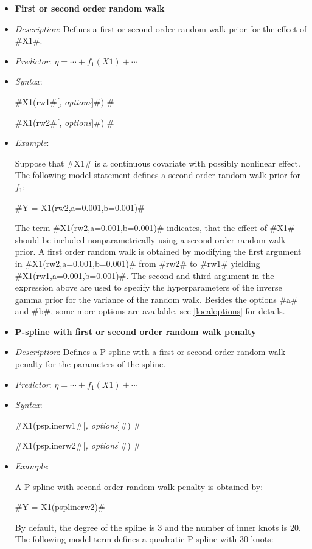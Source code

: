 \begin{itemize}
 \item[]{\bf\sffamily First or second order random walk}
 \item[]{\em Description}: Defines a first or second order random walk
 prior for the effect of #X1#.
 \item[]{\em Predictor}: $\eta = \cdots + f_1(X1) + \cdots $
 \item[] {\em Syntax}:

#X1(rw1#[, {\em options}]#) #

#X1(rw2#[, {\em options}]#) #
\item[] {\em Example}:

Suppose that #X1# is a continuous covariate with possibly
nonlinear effect. The following model statement defines a second
order random walk prior for $f_1$:

#Y = X1(rw2,a=0.001,b=0.001)#

The term #X1(rw2,a=0.001,b=0.001)# indicates, that the effect of
#X1# should be included nonparametrically using a second order
random walk prior. A first order random walk is obtained by
modifying the first argument in #X1(rw2,a=0.001,b=0.001)# from
#rw2# to #rw1# yielding #X1(rw1,a=0.001,b=0.001)#. The second and
third argument in the expression above are used to specify the
hyperparameters of the inverse gamma prior for the variance of the
random walk. Besides the options #a# and #b#, some more options
are available, see \autoref{localoptions} for details.

\item[] {\bf\sffamily P-spline with first or second order random
walk penalty}

\item[] {\em Description}: Defines a P-spline with a first or
second order random walk penalty for the parameters of the spline.
\item[] {\em Predictor}: $\eta =  \cdots + f_1(X1) + \cdots$
\item[] {\em Syntax}:

#X1(psplinerw1#[{\em , options}]#) #

#X1(psplinerw2#[{\em , options}]#) #
\item[] {\em Example}:

A P-spline with second order random walk penalty is obtained by:

#Y = X1(psplinerw2)#

By default, the degree of the spline is 3 and the number of inner
knots is 20. The following model term defines a quadratic P-spline
with 30 knots:


\end{itemize}
